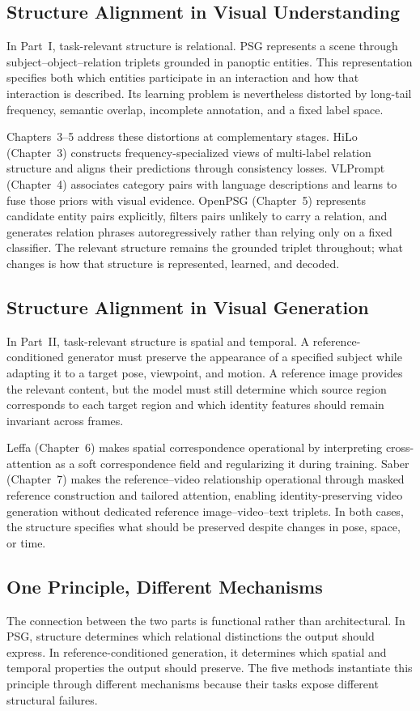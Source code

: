 \subsection*{Structure Alignment in Visual Understanding}
In Part~I, task-relevant structure is relational. PSG represents a scene through subject--object--relation triplets grounded in panoptic entities. This representation specifies both which entities participate in an interaction and how that interaction is described. Its learning problem is nevertheless distorted by long-tail frequency, semantic overlap, incomplete annotation, and a fixed label space.

Chapters~3--5 address these distortions at complementary stages. HiLo (Chapter~3) constructs frequency-specialized views of multi-label relation structure and aligns their predictions through consistency losses. VLPrompt (Chapter~4) associates category pairs with language descriptions and learns to fuse those priors with visual evidence. OpenPSG (Chapter~5) represents candidate entity pairs explicitly, filters pairs unlikely to carry a relation, and generates relation phrases autoregressively rather than relying only on a fixed classifier. The relevant structure remains the grounded triplet throughout; what changes is how that structure is represented, learned, and decoded.

\subsection*{Structure Alignment in Visual Generation}
In Part~II, task-relevant structure is spatial and temporal. A reference-conditioned generator must preserve the appearance of a specified subject while adapting it to a target pose, viewpoint, and motion. A reference image provides the relevant content, but the model must still determine which source region corresponds to each target region and which identity features should remain invariant across frames.

Leffa (Chapter~6) makes spatial correspondence operational by interpreting cross-attention as a soft correspondence field and regularizing it during training. Saber (Chapter~7) makes the reference--video relationship operational through masked reference construction and tailored attention, enabling identity-preserving video generation without dedicated reference image--video--text triplets. In both cases, the structure specifies what should be preserved despite changes in pose, space, or time.

\subsection*{One Principle, Different Mechanisms}
The connection between the two parts is functional rather than architectural. In PSG, structure determines which relational distinctions the output should express. In reference-conditioned generation, it determines which spatial and temporal properties the output should preserve. The five methods instantiate this principle through different mechanisms because their tasks expose different structural failures.

